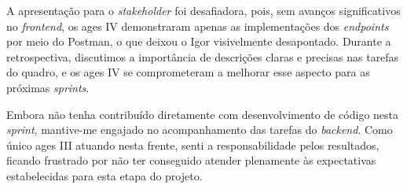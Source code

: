A apresentação para o \textit{stakeholder} foi desafiadora, pois, sem avanços significativos no \textit{frontend}, os \ac{ages} IV demonstraram apenas as implementações dos \textit{endpoints} por meio do Postman, o que deixou o Igor visivelmente desapontado. Durante a retrospectiva, discutimos a importância de descrições claras e precisas nas tarefas do quadro, e os \ac{ages} IV se comprometeram a melhorar esse aspecto para as próximas \textit{sprints}.

Embora não tenha contribuído diretamente com desenvolvimento de código nesta \textit{sprint}, mantive-me engajado no acompanhamento das tarefas do \textit{backend}. Como único \ac{ages} III atuando nesta frente, senti a responsabilidade pelos resultados, ficando frustrado por não ter conseguido atender plenamente às expectativas estabelecidas para esta etapa do projeto.
